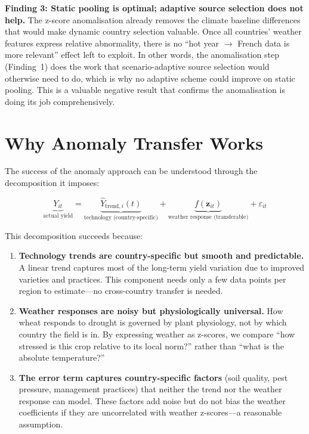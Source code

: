 \documentclass[12pt,a4paper]{report}
\begin{document}
\textbf{Finding 3: Static pooling is optimal; adaptive source selection does not help.} The z-score anomalisation already removes the climate baseline differences that would make dynamic country selection valuable. Once all countries' weather features express relative abnormality, there is no ``hot year $\to$ French data is more relevant'' effect left to exploit. In other words, the anomalisation step (Finding~1) does the work that scenario-adaptive source selection would otherwise need to do, which is why no adaptive scheme could improve on static pooling. This is a valuable negative result that confirms the anomalisation is doing its job comprehensively.

\section{Why Anomaly Transfer Works}

The success of the anomaly approach can be understood through the decomposition it imposes:

\begin{equation}
    \underbrace{Y_{it}}_{\text{actual yield}} = \underbrace{\hat{Y}_{\text{trend},i}(t)}_{\text{technology (country-specific)}} + \underbrace{f(\mathbf{z}_{it})}_{\text{weather response (transferable)}} + \varepsilon_{it}
\end{equation}

This decomposition succeeds because:

\begin{enumerate}
    \item \textbf{Technology trends are country-specific but smooth and predictable.} A linear trend captures most of the long-term yield variation due to improved varieties and practices. This component needs only a few data points per region to estimate---no cross-country transfer is needed.

    \item \textbf{Weather responses are noisy but physiologically universal.} How wheat responds to drought is governed by plant physiology, not by which country the field is in. By expressing weather as z-scores, we compare ``how stressed is this crop relative to its local norm?'' rather than ``what is the absolute temperature?''

    \item \textbf{The error term captures country-specific factors} (soil quality, pest pressure, management practices) that neither the trend nor the weather response can model. These factors add noise but do not bias the weather coefficients if they are uncorrelated with weather z-scores---a reasonable assumption.
\end{enumerate}
\end{document}
